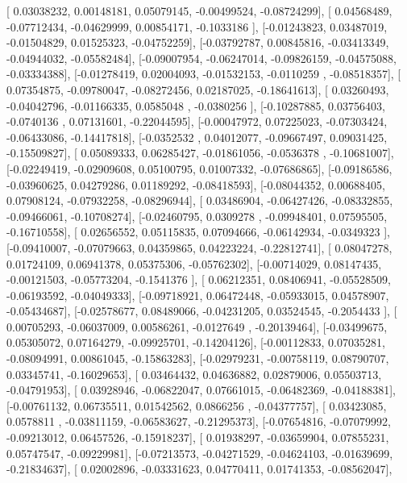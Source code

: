 \documentclass{article}
\begin{document}
       [ 0.03038232,  0.00148181,  0.05079145, -0.00499524, -0.08724299],
       [ 0.04568489, -0.07712434, -0.04629999,  0.00854171, -0.1033186 ],
       [-0.01243823,  0.03487019, -0.01504829,  0.01525323, -0.04752259],
       [-0.03792787,  0.00845816, -0.03413349, -0.04944032, -0.05582484],
       [-0.09007954, -0.06247014, -0.09826159, -0.04575088, -0.03334388],
       [-0.01278419,  0.02004093, -0.01532153, -0.0110259 , -0.08518357],
       [ 0.07354875, -0.09780047, -0.08272456,  0.02187025, -0.18641613],
       [ 0.03260493, -0.04042796, -0.01166335,  0.0585048 , -0.0380256 ],
       [-0.10287885,  0.03756403, -0.0740136 ,  0.07131601, -0.22044595],
       [-0.00047972,  0.07225023, -0.07303424, -0.06433086, -0.14417818],
       [-0.0352532 ,  0.04012077, -0.09667497,  0.09031425, -0.15509827],
       [ 0.05089333,  0.06285427, -0.01861056, -0.0536378 , -0.10681007],
       [-0.02249419, -0.02909608,  0.05100795,  0.01007332, -0.07686865],
       [-0.09186586, -0.03960625,  0.04279286,  0.01189292, -0.08418593],
       [-0.08044352,  0.00688405,  0.07908124, -0.07932258, -0.08296944],
       [ 0.03486904, -0.06427426, -0.08332855, -0.09466061, -0.10708274],
       [-0.02460795,  0.0309278 , -0.09948401,  0.07595505, -0.16710558],
       [ 0.02656552,  0.05115835,  0.07094666, -0.06142934, -0.0349323 ],
       [-0.09410007, -0.07079663,  0.04359865,  0.04223224, -0.22812741],
       [ 0.08047278,  0.01724109,  0.06941378,  0.05375306, -0.05762302],
       [-0.00714029,  0.08147435, -0.00121503, -0.05773204, -0.1541376 ],
       [ 0.06212351,  0.08406941, -0.05528509, -0.06193592, -0.04049333],
       [-0.09718921,  0.06472448, -0.05933015,  0.04578907, -0.05434687],
       [-0.02578677,  0.08489066, -0.04231205,  0.03524545, -0.2054433 ],
       [ 0.00705293, -0.06037009,  0.00586261, -0.0127649 , -0.20139464],
       [-0.03499675,  0.05305072,  0.07164279, -0.09925701, -0.14204126],
       [-0.00112833,  0.07035281, -0.08094991,  0.00861045, -0.15863283],
       [-0.02979231, -0.00758119,  0.08790707,  0.03345741, -0.16029653],
       [ 0.03464432,  0.04636882,  0.02879006,  0.05503713, -0.04791953],
       [ 0.03928946, -0.06822047,  0.07661015, -0.06482369, -0.04188381],
       [-0.00761132,  0.06735511,  0.01542562,  0.0866256 , -0.04377757],
       [ 0.03423085,  0.0578811 , -0.03811159, -0.06583627, -0.21295373],
       [-0.07654816, -0.07079992, -0.09213012,  0.06457526, -0.15918237],
       [ 0.01938297, -0.03659904,  0.07855231,  0.05747547, -0.09229981],
       [-0.07213573, -0.04271529, -0.04624103, -0.01639699, -0.21834637],
       [ 0.02002896, -0.03331623,  0.04770411,  0.01741353, -0.08562047],
\end{document}
